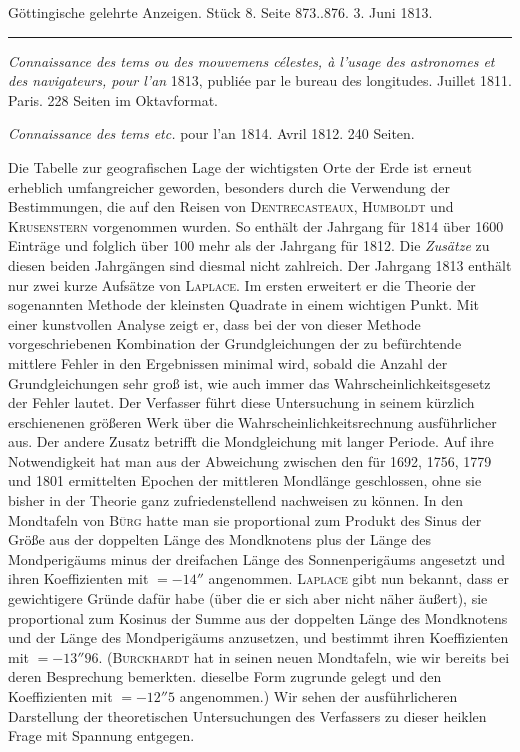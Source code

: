 \clearpage
{}
\hypertarget{native-559-lower}{}\label{native-559-lower}
\begin{center}\small Göttingische gelehrte Anzeigen. Stück 8. Seite 873..876. 3. Juni 1813.\\[3pt]\rule{.72\linewidth}{.3pt}\end{center}

\emph{Connaissance des tems ou des mouvemens célestes, à l'usage des astronomes et des navigateurs, pour l'an} 1813, publiée par le bureau des longitudes. Juillet 1811. Paris. 228 Seiten im Oktavformat.

\emph{Connaissance des tems etc.} pour l'an 1814. Avril 1812. 240 Seiten.

Die Tabelle zur geografischen Lage der wichtigsten Orte der Erde ist erneut erheblich umfangreicher geworden, besonders durch die Verwendung der Bestimmungen, die auf den Reisen von \textsc{Dentrecasteaux}, \textsc{Humboldt} und \textsc{Krusenstern} vorgenommen wurden. So enthält der Jahrgang für 1814 über 1600 Einträge und folglich über 100 mehr als der Jahrgang für 1812. Die \emph{Zusätze} zu diesen beiden Jahrgängen sind diesmal nicht zahlreich. Der Jahrgang 1813 enthält nur zwei kurze Aufsätze von \textsc{Laplace}. Im ersten erweitert er die Theorie der sogenannten Methode der kleinsten Quadrate in einem wichtigen Punkt. Mit einer kunstvollen Analyse zeigt er, dass bei der von dieser Methode vorgeschriebenen Kombination der Grundgleichungen der zu befürchtende mittlere Fehler in den Ergebnissen minimal wird, sobald die Anzahl der Grundgleichungen sehr groß ist, wie auch immer das Wahrscheinlichkeitsgesetz der Fehler lautet. Der Verfasser führt diese Untersuchung in seinem kürzlich erschienenen größeren Werk über die Wahrscheinlichkeitsrechnung ausführlicher aus. Der andere Zusatz betrifft die Mondgleichung mit langer Periode. Auf ihre Notwendigkeit hat man aus der Abweichung zwischen den für 1692, 1756, 1779 und 1801 ermittelten Epochen der mittleren Mondlänge geschlossen, ohne sie bisher in der Theorie ganz zufriedenstellend nachweisen zu können. In den Mondtafeln von \textsc{Bürg} hatte man sie proportional zum Produkt des Sinus der Größe aus der doppelten Länge des Mondknotens plus der Länge des Mondperigäums minus der dreifachen Länge des Sonnenperigäums angesetzt und ihren Koeffizienten mit $= -14''$ angenommen. \textsc{Laplace} gibt nun bekannt, dass er gewichtigere Gründe dafür habe (über die er sich aber nicht näher äußert), sie proportional zum Kosinus der Summe aus der doppelten Länge des Mondknotens und der Länge des Mondperigäums anzusetzen, und bestimmt ihren Koeffizienten mit $= -13''96$. (\textsc{Burckhardt} hat in seinen neuen Mondtafeln, wie wir bereits bei deren Besprechung bemerkten. dieselbe Form zugrunde gelegt und den Koeffizienten mit $= -12''5$ angenommen.) Wir sehen der ausführlicheren Darstellung der theoretischen Untersuchungen des Verfassers zu dieser heiklen Frage mit Spannung entgegen.

